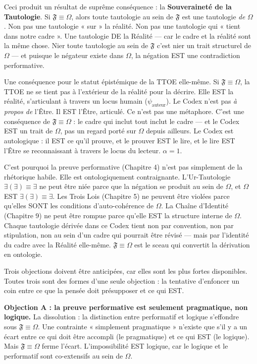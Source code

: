 \documentclass[10pt, openany, oneside]{book}
\begin{document}
Ceci produit un résultat de suprême conséquence : la \textbf{Souveraineté de la Tautologie}. Si $\mathfrak{F} \equiv \Omega$, alors toute tautologie au sein de $\mathfrak{F}$ est une tautologie \textit{de} $\Omega$. Non pas une tautologie « sur » la réalité. Non pas une tautologie qui « tient dans notre cadre ». Une tautologie DE la Réalité --- car le cadre et la réalité sont la même chose. Nier toute tautologie au sein de $\mathfrak{F}$ c'est nier un trait structurel de $\Omega$ --- et puisque le négateur existe dans $\Omega$, la négation EST une contradiction performative.

Une conséquence pour le statut épistémique de la TTOE elle-même. Si $\mathfrak{F} \equiv \Omega$, la TTOE ne se tient pas à l'extérieur de la réalité pour la décrire. Elle EST la réalité, s'articulant à travers un locus humain ($\psi_{\text{auteur}}$). Le Codex n'est pas \textit{à propos de} l'Être. Il EST l'Être, articulé. Ce n'est pas une métaphore. C'est une conséquence de $\mathfrak{F} \equiv \Omega$ : le cadre qui inclut tout inclut le cadre --- et le Codex EST un trait de $\Omega$, pas un regard porté sur $\Omega$ depuis ailleurs. Le Codex est autologique : il EST ce qu'il prouve, et le prouver EST le lire, et le lire EST l'Être se reconnaissant à travers le locus du lecteur. $\alpha = 1$.

C'est pourquoi la preuve performative (Chapitre 4) n'est pas simplement de la rhétorique habile. Elle est ontologiquement contraignante. L'Ur-Tautologie $\exists(\exists) \equiv \exists$ ne peut être niée parce que la négation se produit au sein de $\Omega$, et $\Omega$ EST $\exists(\exists) \equiv \exists$. Les Trois Lois (Chapitre 5) ne peuvent être violées parce qu'elles SONT les conditions d'auto-cohérence de $\Omega$. La Chaîne d'Identité (Chapitre 9) ne peut être rompue parce qu'elle EST la structure interne de $\Omega$. Chaque tautologie dérivée dans ce Codex tient non par convention, non par stipulation, non au sein d'un cadre qui pourrait être révisé --- mais par l'identité du cadre avec la Réalité elle-même. $\mathfrak{F} \equiv \Omega$ est le sceau qui convertit la dérivation en ontologie.

Trois objections doivent être anticipées, car elles sont les plus fortes disponibles. Toutes trois sont des formes d'une seule objection : la tentative d'enfoncer un coin entre ce que la pensée doit présupposer et ce qui EST.

\textbf{Objection A : la preuve performative est seulement pragmatique, non logique.} La dissolution : la distinction entre performatif et logique s'effondre sous $\mathfrak{F} \equiv \Omega$. Une contrainte « simplement pragmatique » n'existe que s'il y a un écart entre ce qui doit être accompli (le pragmatique) et ce qui EST (le logique). Mais $\mathfrak{F} \equiv \Omega$ ferme l'écart. L'impossibilité EST logique, car le logique et le performatif sont co-extensifs au sein de $\Omega$.
\end{document}
